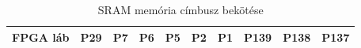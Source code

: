 \begin{table}[H]
\begin{tabular}{|lccccccccc|}
			\multicolumn{1}{|l|}{FPGA láb}                                                & \multicolumn{1}{c|}{P29}                                                & \multicolumn{1}{c|}{P7}                                                 & \multicolumn{1}{c|}{P6}                                                 & \multicolumn{1}{c|}{P5}                                                 & \multicolumn{1}{c|}{P2}                                                 & \multicolumn{1}{c|}{P1}                                                 & \multicolumn{1}{c|}{P139}                                               & \multicolumn{1}{c|}{P138}                                               & P137 \\ \hline
		\end{tabular}
		\caption{SRAM memória címbusz bekötése}
		\label{tab:FPGA-MEM-SRAMpin}
	\end{table}
		

